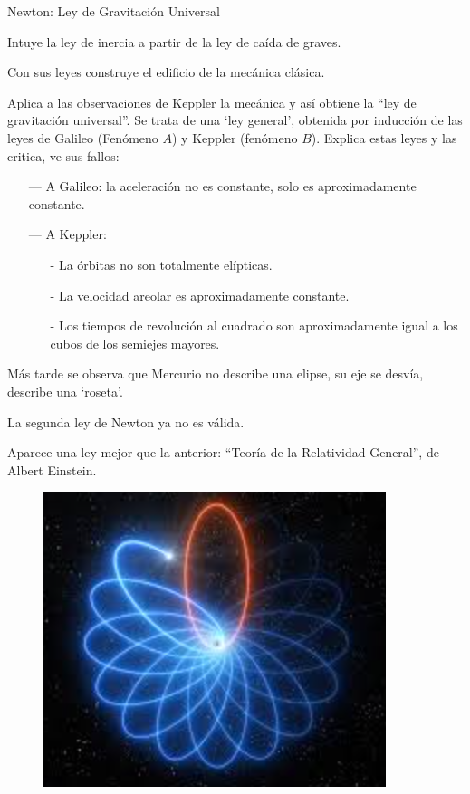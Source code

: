 \begin{ejem}{Newton: Ley de Gravitación Universal}

Intuye la ley de inercia a partir de la ley de caída de graves.

Con sus leyes construye el edificio de la mecánica clásica.	

Aplica a las observaciones de Keppler la mecánica y así obtiene la ``ley de gravitación universal''. Se trata de una `ley general', obtenida por inducción de las leyes de Galileo (Fenómeno $A$) y Keppler (fenómeno $B$). Explica estas leyes y las critica, ve sus fallos:

\begin{itemize}
\item [---] A Galileo: la aceleración no es constante, solo es aproximadamente constante.
\item [---] A Keppler: 
	\begin{itemize}
	\item [-] La órbitas no son totalmente elípticas. 	
	\item [-] La velocidad areolar es aproximadamente constante.
	\item [-] Los tiempos de revolución al cuadrado son aproximadamente igual a los cubos de los semiejes mayores.
	\end{itemize}
\end{itemize}
\end{ejem}

\begin{multicols}{2}
Más tarde se observa que Mercurio no describe una elipse, su eje se desvía, describe una `roseta'.

La segunda ley de Newton ya no es válida.

Aparece una ley mejor que la anterior: ``Teoría de la Relatividad General'', de Albert Einstein.
\begin{figure}[H]
	\centering
	\includegraphics[width=.4\textwidth]{imagenes/imagenes01/T01IM02.png}
	\end{figure}
\end{multicols}

